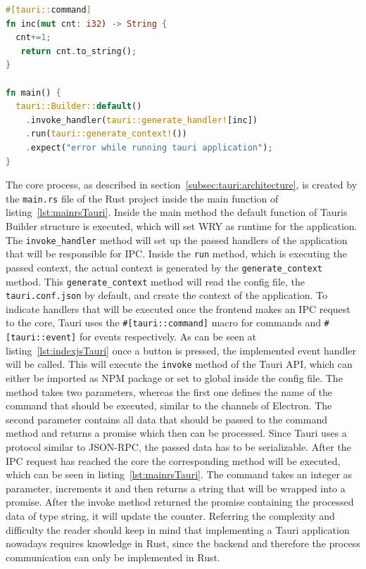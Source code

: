 \begin{lstlisting}[language=Rust,label={lst:mainrsTauri}, caption={Excerpt of main.rs}]
#[tauri::command]
fn inc(mut cnt: i32) -> String {
  cnt+=1;
   return cnt.to_string();
}

fn main() {
  tauri::Builder::default()
    .invoke_handler(tauri::generate_handler![inc])
    .run(tauri::generate_context!())
    .expect("error while running tauri application");
}
\end{lstlisting}
The core process, as described in section~\ref{subsec:tauri:architecture}, is created by the \texttt{main.rs} file of the Rust project inside the main function of listing~\ref{lst:mainrsTauri}.
Inside the main method the default function of Tauris Builder structure is executed, which will set WRY as runtime for the application.
The \texttt{invoke\_handler} method will set up the passed handlers of the application that will be responsible for \ac{IPC}.
Inside the \texttt{run} method, which is executing the passed context, the actual context is generated by the \texttt{generate\_context} method.
This \texttt{generate\_context} method will read the config file, the \texttt{tauri.conf.json} by default, and create the context of the application.
To indicate handlers that will be executed once the frontend makes an \ac{IPC} request to the core, Tauri uses the \texttt{\#[tauri::command]} macro for commands and \texttt{\#[tauri::event]} for events respectively.
As can be seen at listing~\ref{lst:indexjsTauri} once a button is pressed, the implemented event handler will be called.
This will execute the \texttt{invoke} method of the Tauri \ac{API}, which can either be imported as \ac{NPM} package or set to global inside the config file.
The method takes two parameters, whereas the first one defines the name of the command that should be executed, similar to the channels of Electron.
The second parameter contains all data that should be passed to the command method and returns a promise which then can be processed.
Since Tauri uses a protocol similar to \ac{JSON-RPC}, the passed data has to be serializable.
After the \ac{IPC} request has reached the core the corresponding method will be executed, which can be seen in listing~\ref{lst:mainrsTauri}.
The command takes an integer as parameter, increments it and then returns a string that will be wrapped into a promise.
After the invoke method returned the promise containing the processed data of type string, it will update the counter.
Referring the complexity and difficulty the reader should keep in mind that implementing a Tauri application nowadays requires knowledge in Rust, since the backend and therefore the process communication can only be implemented in Rust.
